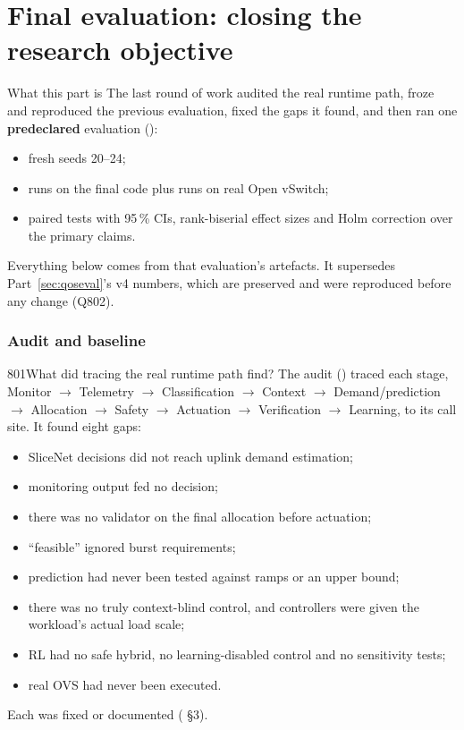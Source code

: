 \part{Final evaluation: closing the research objective}\label{part:final}

\begin{keybox}{What this part is}
The last round of work audited the real runtime path, froze and reproduced the previous evaluation, fixed the gaps
it found, and then ran one \textbf{predeclared} evaluation ():
\begin{itemize}
\item fresh seeds 20--24;
\item \NFRuns{} runs on the final code plus \NOvsRuns{} runs on real Open vSwitch;
\item paired tests with 95\,\% CIs, rank-biserial effect sizes and Holm correction over the primary claims.
\end{itemize}
Everything below comes from that evaluation's artefacts. It supersedes Part~\ref{sec:qoseval}'s v4 numbers, which
are preserved and were reproduced before any change (Q802).
\end{keybox}

\section{Audit and baseline}

\begin{qa}{801}{What did tracing the real runtime path find?}
The audit () traced each stage, Monitor $\rightarrow$ Telemetry $\rightarrow$ Classification
$\rightarrow$ Context $\rightarrow$ Demand/prediction $\rightarrow$ Allocation $\rightarrow$ Safety $\rightarrow$
Actuation $\rightarrow$ Verification $\rightarrow$ Learning, to its call site. It found eight gaps:
\begin{itemize}
\item SliceNet decisions did not reach uplink demand estimation;
\item monitoring output fed no decision;
\item there was no validator on the final allocation before actuation;
\item ``feasible'' ignored burst requirements;
\item prediction had never been tested against ramps or an upper bound;
\item there was no truly context-blind control, and controllers were given the workload's actual load scale;
\item RL had no safe hybrid, no learning-disabled control and no sensitivity tests;
\item real OVS had never been executed.
\end{itemize}
Each was fixed or documented ( \S3).
\end{qa}

